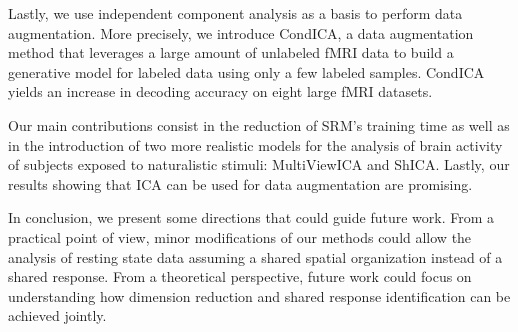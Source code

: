 Lastly, we use independent component analysis as a basis to perform data augmentation.  More precisely, we introduce CondICA, a data augmentation method that leverages a large amount of unlabeled fMRI data to build a generative model for labeled data using only a few labeled samples. CondICA yields an increase in decoding accuracy on eight large fMRI datasets.

Our main contributions consist in the reduction of SRM's training time as well as in the introduction of two more realistic models for the analysis of brain activity of subjects exposed to naturalistic stimuli: MultiViewICA and ShICA. Lastly, our results showing that ICA can be used for data augmentation are promising.

In conclusion, we present some directions that could guide future work. From a
practical point of view, minor modifications of our methods could allow the
analysis of resting state data assuming a shared spatial organization instead of a shared response. From a theoretical perspective, future work could focus on understanding how dimension reduction and shared response identification can be achieved jointly.
\pagebreak 

